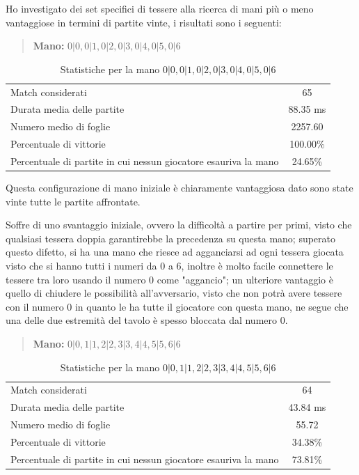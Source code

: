 \documentclass[a4paper,12pt]{report} %
\begin{document}
Ho investigato dei set specifici di tessere alla ricerca di mani più o meno vantaggiose in termini di partite vinte, i risultati sono i seguenti:


\begin{quote}
    \textbf{Mano:} \(0|0, 0|1, 0|2, 0|3, 0|4, 0|5, 0|6\)
\end{quote}

\begin{table}[h!]
    \centering
    \begin{tabular}{|l|c|}
        \hline
        Match considerati & 65 \\
        Durata media delle partite & 88.35 ms \\
        Numero medio di foglie & 2257.60 \\
        Percentuale di vittorie & 100.00\% \\
        Percentuale di partite in cui nessun giocatore esauriva la mano & 24.65\% \\
        \hline
    \end{tabular}
    \caption{Statistiche per la mano \(0|0, 0|1, 0|2, 0|3, 0|4, 0|5, 0|6\)}
    \label{tab:stats_1}
\end{table}

Questa configurazione di mano iniziale è chiaramente vantaggiosa dato sono state vinte tutte le partite affrontate.

Soffre di uno svantaggio iniziale, ovvero la difficoltà a partire per primi, visto che qualsiasi tessera doppia garantirebbe la precedenza su questa mano; superato questo difetto,
si ha una mano che riesce ad agganciarsi ad ogni tessera giocata visto che si hanno tutti i numeri da 0 a 6, inoltre è molto facile connettere le tessere tra loro usando il numero 0 come "aggancio";
un ulteriore vantaggio è quello di chiudere le possibilità all'avversario, visto che non potrà avere tessere con il numero 0 in quanto le ha tutte il giocatore con questa mano, ne segue che una delle 
due estremità del tavolo è spesso bloccata dal numero 0. 


\begin{quote}
    \textbf{Mano:} \(0|0, 1|1, 2|2, 3|3, 4|4, 5|5, 6|6\)
\end{quote}

\begin{table}[h!]
    \centering
    \begin{tabular}{|l|c|}
        \hline
        Match considerati & 64 \\
        Durata media delle partite & 43.84 ms \\
        Numero medio di foglie & 55.72 \\
        Percentuale di vittorie & 34.38\% \\
        Percentuale di partite in cui nessun giocatore esauriva la mano & 73.81\% \\
        \hline
    \end{tabular}
    \caption{Statistiche per la mano \(0|0, 1|1, 2|2, 3|3, 4|4, 5|5, 6|6\)}
    \label{tab:stats_1}
\end{table}
\end{document}
